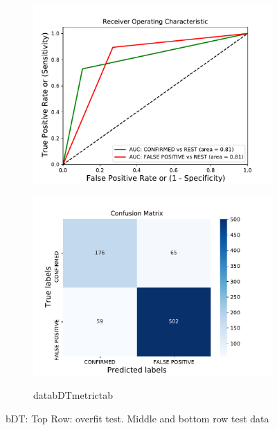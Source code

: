 \begin{figure}[H]
\begin{subfigure}{.49\textwidth}
                \includegraphics[width = 1\textwidth]{data/bDT_roc.pdf}
                \end{subfigure}
                \begin{subfigure}{.49\textwidth}
                \includegraphics[width = 1\textwidth]{data/bDT_cm.pdf}
                \end{subfigure}
                \begin{subfigure}{1\textwidth}
                \csname databDTmetrictab\endcsname
                \end{subfigure}
                \caption{bDT: Top Row: overfit test. Middle and bottom row test data}
                \label{fig:data/bDT_roc}
                \end{figure}